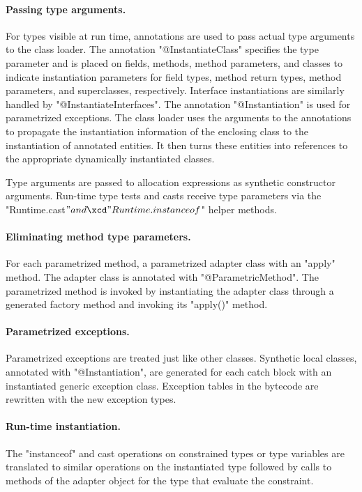 \paragraph{Passing type arguments.}

For types visible at run time, annotations are used to
pass actual type arguments to the class loader.
The annotation \xcd"@InstantiateClass"
specifies the type parameter and
is placed on
fields, methods,
method parameters, and classes to
indicate instantiation parameters for field
types, method return types, method parameters, and superclasses,
respectively.
Interface instantiations are similarly handled
by \xcd"@InstantiateInterfaces".
The annotation
\xcd"@Instantiation"
is used for parametrized exceptions.
The class loader uses the arguments to the annotations to
propagate the instantiation information of the enclosing class
to the instantiation of annotated entities.  It then turns these
entities into references to the appropriate dynamically
instantiated classes.

Type arguments are passed to allocation expressions as
synthetic constructor arguments.  Run-time type tests and casts
receive type parameters via the \xcd"Runtime.cast$" and
\xcd"Runtime.instanceof$" helper methods.

\paragraph{Eliminating method type parameters.}

For each parametrized method, a parametrized
adapter class with an \xcd"apply" method.  The adapter class
is annotated with \xcd"@ParametricMethod".
The parametrized method is invoked by instantiating the adapter
class through a generated factory method
and invoking its \xcd"apply()" method.

\paragraph{Parametrized exceptions.}

Parametrized exceptions are treated just like other classes.
Synthetic local classes, annotated with \xcd"@Instantiation",
are generated for each catch block with an instantiated
generic exception class.  Exception tables in the
bytecode are rewritten with the new exception types.

\paragraph{Run-time instantiation.}

The
\xcd"instanceof" and cast operations on
constrained types or type variables
are translated
to
similar operations on the instantiated type followed by calls
to
methods of the adapter object for the type
that evaluate the constraint.
